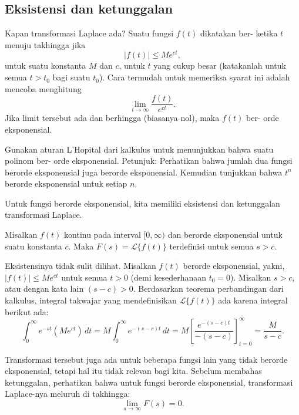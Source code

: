 \subsection{Eksistensi dan ketunggalan}

Kapan transformasi Laplace ada?  Suatu fungsi $f(t)$ dikatakan ber-
\emph{} ketika $t$ menuju takhingga jika
\begin{equation*}
\lvert f(t) \rvert \leq M e^{ct} ,
\end{equation*}
untuk suatu konstanta $M$ dan $c$, untuk
$t$ yang cukup besar (katakanlah untuk semua $t > t_0$ bagi suatu $t_0$).  Cara termudah
untuk memeriksa syarat ini adalah mencoba menghitung
\begin{equation*}
\lim_{t\to \infty} \frac{f(t)}{e^{ct}} .
\end{equation*}
Jika limit tersebut ada dan berhingga (biasanya nol), maka $f(t)$ ber-
orde eksponensial.

\begin{exercise}
Gunakan aturan L'Hopital dari kalkulus untuk menunjukkan bahwa suatu polinom ber-
orde eksponensial.  Petunjuk: Perhatikan bahwa jumlah dua fungsi berorde eksponensial
juga berorde eksponensial.  Kemudian tunjukkan bahwa $t^n$ berorde eksponensial
untuk setiap $n$.
\end{exercise}

Untuk fungsi berorde eksponensial, kita memiliki eksistensi dan ketunggalan
transformasi Laplace.

\begin{theorem}[Eksistensi]
Misalkan $f(t)$ kontinu pada interval $[0,\infty)$ dan berorde eksponensial untuk suatu
konstanta $c$.  Maka $F(s) = \mathcal{L} \bigl\{ f(t) \bigr\}$ terdefinisi untuk
semua $s > c$.
\end{theorem}

Eksistensinya tidak sulit dilihat.  Misalkan $f(t)$ berorde eksponensial,
yakni, $\lvert f(t) \rvert \leq M e^{ct}$ untuk semua $t > 0$ (demi kesederhanaan $t_0 = 0$).
Misalkan $s > c$, atau dengan kata lain $(s-c) > 0$.
Berdasarkan teorema perbandingan dari kalkulus, integral takwajar yang mendefinisikan
$\mathcal{L} \bigl\{ f(t) \bigr\}$ ada karena integral berikut ada:
\begin{equation*}
\int_0^\infty e^{-st} ( M e^{ct} ) \,dt
=
M \int_0^\infty e^{-(s-c)t} \,dt = M \left[ \frac{e^{-(s-c)t}}{-(s-c)}
\right]_{t=0}^\infty = \frac{M}{s-c} .
\end{equation*}

Transformasi tersebut juga ada untuk beberapa fungsi lain
yang tidak berorde
eksponensial, tetapi hal itu tidak relevan bagi kita.
Sebelum membahas ketunggalan,
perhatikan bahwa untuk fungsi berorde eksponensial,
transformasi Laplace-nya meluruh di takhingga:
\begin{equation*}
\lim_{s\to\infty} F(s) = 0 .
\end{equation*}


